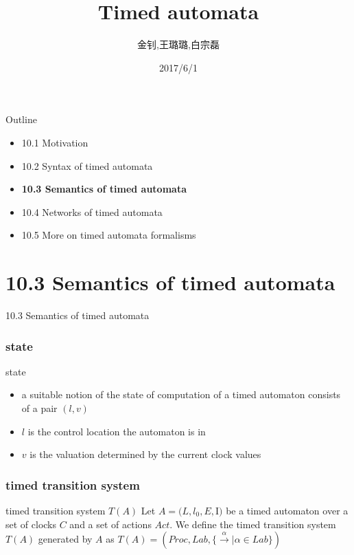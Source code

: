 \documentclass{beamer}
\title[标题]{Timed automata}
\author[作者]{金钊,王璐璐,白宗磊}
\institute[单位]{北京大学信息科学与技术学院}
\date[日期]{2017/6/1}
\begin{document}

\begin{frame}
    \titlepage
\end{frame}


\begin{frame}{Outline}
    \begin{itemize}
   		\item 10.1 Motivation
   		\item 10.2 Syntax of timed automata
   		\item \textbf{10.3 Semantics of timed automata}
   		\item 10.4 Networks of timed automata
   		\item 10.5 More on timed automata formalisms
    \end{itemize}
\end{frame}


\section{10.3 Semantics of timed automata}

\begin{frame}
	\begin{center}
		\item 10.3 Semantics of timed automata
	\end{center}
\end{frame}


\begin{frame}
	\frametitle{state}
	\begin{block}{state}
		\begin{itemize}
			\item a suitable notion of the state of computation of a timed automaton consists of a pair $(l,v)$
			\item $l$ is the control location the automaton is in
			\item $v$ is the valuation determined by the current clock values
		\end{itemize}		
	\end{block}
\end{frame}


\begin{frame}
	\frametitle{timed transition system}
	\begin{block}{timed transition system $T(A)$}
		Let $A = (L, l_0, E, $I$)$ be a timed automaton over a set of clocks $C$ and a set of actions $Act$. We define the timed transition system $T(A)$ generated by $A$ as $T(A) = (Proc, Lab, \{ \stackrel{\alpha}{\longrightarrow} | \alpha \in Lab \})$
	\end{block}
\end{frame}
\end{document}
